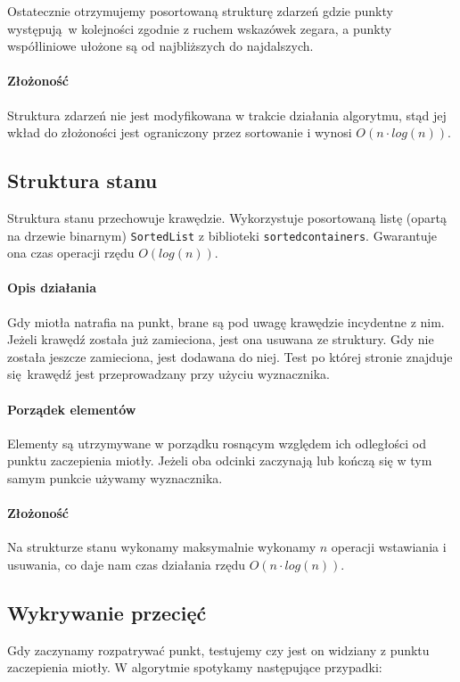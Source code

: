 \documentclass[12pt]{article}
\begin{document}
			\vspace{\baselineskip} %
			Ostatecznie otrzymujemy posortowaną strukturę zdarzeń gdzie punkty występują w kolejności zgodnie z ruchem wskazówek zegara, a punkty współliniowe ułożone są od najbliższych do najdalszych.
			
			\paragraph{Złożoność}
				Struktura zdarzeń nie jest modyfikowana w trakcie działania algorytmu, stąd jej wkład do złożoności jest ograniczony przez sortowanie i wynosi $ O(n \cdot log(n)) $.
		
		\subsection{Struktura stanu}
			Struktura stanu przechowuje krawędzie. Wykorzystuje posortowaną listę (opartą na drzewie binarnym) \lstinline|SortedList| z biblioteki \lstinline|sortedcontainers|. Gwarantuje ona czas operacji rzędu $ O(log(n)) $.
			
			\paragraph{Opis działania}
				Gdy miotła natrafia na punkt, brane są pod uwagę krawędzie incydentne z nim. Jeżeli krawędź została już zamieciona, jest ona usuwana ze struktury. Gdy nie została jeszcze zamieciona, jest dodawana do niej. Test po której stronie znajduje się krawędź jest przeprowadzany przy użyciu wyznacznika.
				
			\paragraph{Porządek elementów}
				Elementy są utrzymywane w porządku rosnącym względem ich odległości od punktu zaczepienia miotły. Jeżeli oba odcinki zaczynają lub kończą się w tym samym punkcie używamy wyznacznika.
				
			\paragraph{Złożoność}
				Na strukturze stanu wykonamy maksymalnie wykonamy $ n $ operacji wstawiania i usuwania, co daje nam czas działania rzędu $ O(n \cdot log(n)) $.
		
		\subsection{Wykrywanie przecięć}
			Gdy zaczynamy rozpatrywać punkt, testujemy czy jest on widziany z punktu zaczepienia miotły.  W algorytmie spotykamy następujące przypadki:
			
\end{document}
